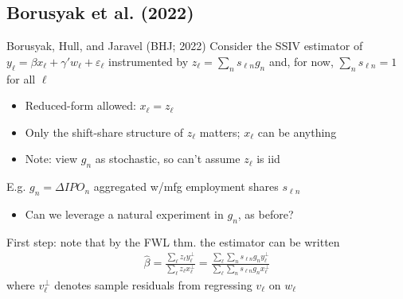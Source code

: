 \documentclass{beamer}
\begin{document}
\subsection{Borusyak et al. (2022)}
\begin{frame}{Borusyak, Hull, and Jaravel (BHJ; 2022)}
\vspace{-0.2cm}
Consider the SSIV estimator of $y_\ell=\beta x_\ell+\gamma'w_\ell+\varepsilon_\ell$ instrumented by $z_\ell=\sum_n s_{\ell n}g_n$ and, for now, $\sum_n s_{\ell n}=1$ for all $\ell$
\smallskip
	\begin{itemize}
	\item Reduced-form allowed: $x_\ell=z_\ell$ \smallskip
	\item Only the shift-share structure of $z_\ell$ matters; $x_\ell$ can be anything 
	\smallskip
	\item Note: view $g_n$ as stochastic, so can't assume $z_\ell$ is iid
	\end{itemize}

\medskip\pause{}
E.g. $g_n= \Delta IPO_{n}$ aggregated w/mfg employment shares $s_{\ell n}$\smallskip
\begin{itemize}
\item Can we leverage a natural experiment in $g_n$, as before?
\end{itemize}
\medskip\pause{}

First step: note that by the FWL thm. the estimator can be written
\begin{align*}
\hat{\beta}=\frac{\sum_\ell z_\ell y_\ell^\perp}{\sum_\ell z_\ell x_\ell^\perp}=\frac{\sum_\ell \sum_n s_{\ell n}g_n y_\ell^\perp}{\sum_\ell \sum_n s_{\ell n}g_n x_\ell^\perp}
\end{align*}
where $v_\ell^\perp$ denotes sample residuals from regressing $v_\ell$ on $w_\ell$

\end{frame}
\end{document}
